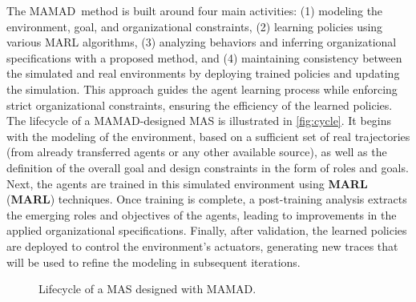 \documentclass[pdflatex,sn-mathphys-num]{sn-jnl}%
\theoremstyle{thmstyleone}%
\theoremstyle{thmstyletwo}%
\theoremstyle{thmstylethree}%
\begin{document}
The MAMAD~\footnotemark[1] method is built around four main activities: (1) modeling the environment, goal, and organizational constraints, (2) learning policies using various MARL algorithms, (3) analyzing behaviors and inferring organizational specifications with a proposed method, and (4) maintaining consistency between the simulated and real environments by deploying trained policies and updating the simulation. This approach guides the agent learning process while enforcing strict organizational constraints, ensuring the efficiency of the learned policies. The lifecycle of a MAMAD-designed MAS is illustrated in \autoref{fig:cycle}. It begins with the modeling of the environment, based on a sufficient set of real trajectories (from already transferred agents or any other available source), as well as the definition of the overall goal and design constraints in the form of roles and goals. Next, the agents are trained in this simulated environment using \textbf{MARL} (\textbf{MARL}) techniques. Once training is complete, a post-training analysis extracts the emerging roles and objectives of the agents, leading to improvements in the applied organizational specifications. Finally, after validation, the learned policies are deployed to control the environment's actuators, generating new traces that will be used to refine the modeling in subsequent iterations.
%
\begin{figure}[h!]
    \centering
    
    \caption{Lifecycle of a MAS designed with MAMAD.}
    \label{fig:cycle}
\end{figure}
\end{document}
